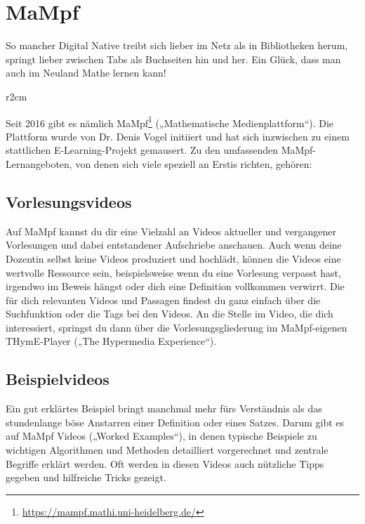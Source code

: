 
\section{MaMpf}
\label{mampf}

\noindent So mancher Digital Native treibt sich lieber im Netz als in Bibliotheken herum, springt lieber zwischen Tabs als Buchseiten hin und her. Ein Glück, dass man auch im Neuland Mathe lernen kann!

\begin{wrapfigure}[7]{r}{2cm}
\vspace{-3mm} %
\hspace*{-7mm}
\end{wrapfigure}

Seit 2016 gibt es nämlich MaMpf\footnote{\url{https://mampf.mathi.uni-heidelberg.de/}} („Mathematische Medienplattform“). Die Plattform wurde von Dr. Denis Vogel initiiert und hat sich inzwischen zu einem stattlichen E-Learning-Projekt gemausert. Zu den umfassenden MaMpf-Lernangeboten, von denen sich viele speziell an Erstis richten, gehören: 
 
\subsection{Vorlesungsvideos}
Auf MaMpf kannst du dir eine Vielzahl an Videos aktueller und vergangener Vorlesungen und dabei entstandener Aufschriebe anschauen. Auch wenn deine Dozentin selbst keine Videos produziert und hochlädt, können die Videos eine wertvolle Ressource sein, beispielsweise wenn du eine Vorlesung verpasst hast, irgendwo im Beweis hängst oder dich eine Definition vollkommen verwirrt. Die für dich relevanten Videos und Passagen findest du ganz einfach über die Suchfunktion oder die Tags bei den Videos. An die Stelle im Video, die dich interessiert, springst du dann über die Vorlesungsgliederung im MaMpf-eigenen THymE-Player („The Hypermedia Experience“).

\subsection{Beispielvideos}
Ein gut erklärtes Beispiel bringt manchmal mehr fürs Verständnis als das stundenlange böse Anstarren einer Definition oder eines Satzes. Darum gibt es auf MaMpf Videos („Worked Examples“), in denen typische Beispiele zu wichtigen Algorithmen und Methoden detailliert vorgerechnet und zentrale Begriffe erklärt werden. Oft werden in diesen Videos auch nützliche Tipps gegeben und hilfreiche Tricks gezeigt.

